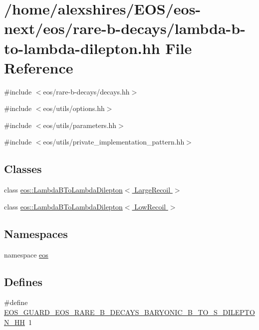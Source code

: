 \hypertarget{lambda-b-to-lambda-dilepton_8hh}{
\section{/home/alexshires/EOS/eos-\/next/eos/rare-\/b-\/decays/lambda-\/b-\/to-\/lambda-\/dilepton.hh File Reference}
\label{lambda-b-to-lambda-dilepton_8hh}
}
{\ttfamily \#include $<$eos/rare-\/b-\/decays/decays.hh$>$}\par
{\ttfamily \#include $<$eos/utils/options.hh$>$}\par
{\ttfamily \#include $<$eos/utils/parameters.hh$>$}\par
{\ttfamily \#include $<$eos/utils/private\_\-implementation\_\-pattern.hh$>$}\par
\subsection*{Classes}
\begin{DoxyCompactItemize}
\item 
class \hyperlink{classeos_1_1LambdaBToLambdaDilepton_3_01LargeRecoil_01_4}{eos::LambdaBToLambdaDilepton$<$ LargeRecoil $>$}
\item 
class \hyperlink{classeos_1_1LambdaBToLambdaDilepton_3_01LowRecoil_01_4}{eos::LambdaBToLambdaDilepton$<$ LowRecoil $>$}
\end{DoxyCompactItemize}
\subsection*{Namespaces}
\begin{DoxyCompactItemize}
\item 
namespace \hyperlink{namespaceeos}{eos}
\end{DoxyCompactItemize}
\subsection*{Defines}
\begin{DoxyCompactItemize}
\item 
\#define \hyperlink{lambda-b-to-lambda-dilepton_8hh_a6e4a83beb9a76b3e392c4d2f1559cc26}{EOS\_\-GUARD\_\-EOS\_\-RARE\_\-B\_\-DECAYS\_\-BARYONIC\_\-B\_\-TO\_\-S\_\-DILEPTON\_\-HH}~1
\end{DoxyCompactItemize}


